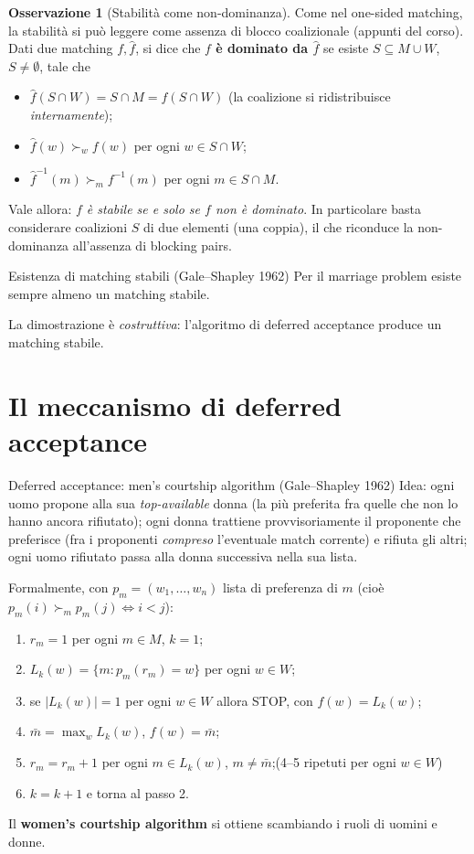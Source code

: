 \documentclass[12pt,a4paper,twoside]{book}
\theoremstyle{plain}
\theoremstyle{definition}
\newtheorem{remark}[theorem]{Osservazione}
\begin{document}
\begin{remark}[Stabilità come non-dominanza]
Come nel one-sided matching, la stabilità si può leggere come assenza di blocco coalizionale (appunti del corso). Dati due matching $f,\hat f$, si dice che \textbf{$f$ è dominato da $\hat f$} se esiste $S\subseteq M\cup W$, $S\ne\emptyset$, tale che
\begin{itemize}
  \item[(i)] $\hat f(S\cap W)=S\cap M=f(S\cap W)$ (la coalizione si ridistribuisce \emph{internamente});
  \item[(ii)] $\hat f(w)\succ_w f(w)$ per ogni $w\in S\cap W$;
  \item[(iii)] $\hat f^{-1}(m)\succ_m f^{-1}(m)$ per ogni $m\in S\cap M$.
\end{itemize}
Vale allora: \emph{$f$ è stabile se e solo se $f$ non è dominato}. In particolare basta considerare coalizioni $S$ di due elementi (una coppia), il che riconduce la non-dominanza all'assenza di blocking pairs.
\end{remark}

\begin{thmbox}{Esistenza di matching stabili (Gale--Shapley 1962)}
Per il marriage problem esiste sempre almeno un matching stabile.
\end{thmbox}

La dimostrazione è \emph{costruttiva}: l'algoritmo di deferred acceptance produce un matching stabile.

\section{Il meccanismo di deferred acceptance}

\begin{defbox}{Deferred acceptance: men's courtship algorithm (Gale--Shapley 1962)}
Idea: ogni uomo propone alla sua \emph{top-available} donna (la più preferita fra quelle che non lo hanno ancora rifiutato); ogni donna trattiene provvisoriamente il proponente che preferisce (fra i proponenti \emph{compreso} l'eventuale match corrente) e rifiuta gli altri; ogni uomo rifiutato passa alla donna successiva nella sua lista.

Formalmente, con $p_m=(w_1,\dots,w_n)$ lista di preferenza di $m$ (cioè $p_m(i)\succ_m p_m(j)\iff i<j$):
\begin{enumerate}
  \item $r_m=1$ per ogni $m\in M$, $k=1$;
  \item $L_k(w)=\{m : p_m(r_m)=w\}$ per ogni $w\in W$;
  \item se $|L_k(w)|=1$ per ogni $w\in W$ allora STOP, con $f(w)=L_k(w)$;
  \item $\bar m=\max_w L_k(w)$, $f(w)=\bar m$;
  \item $r_m=r_m+1$ per ogni $m\in L_k(w)$, $m\ne\bar m$;\quad (4--5 ripetuti per ogni $w\in W$)
  \item $k=k+1$ e torna al passo 2.
\end{enumerate}
Il \textbf{women's courtship algorithm} si ottiene scambiando i ruoli di uomini e donne.
\end{defbox}
\end{document}
